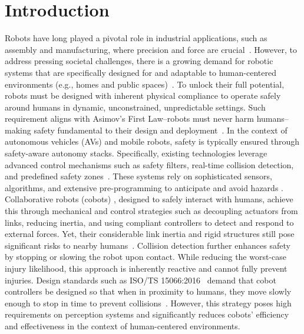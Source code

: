 \section{Introduction}
Robots have long played a pivotal role in industrial applications, such as assembly and manufacturing, where precision and force are crucial~\cite{todd1996fundamentals}.
However, to address pressing societal challenges, there is a growing demand for robotic systems that are specifically designed for and adaptable to human-centered environments (e.g., homes and public spaces)~\cite{nahavandi2019industry, chibani2013ubiquitous, royakkers2015literature}.
To unlock their full potential, robots must be designed with inherent physical compliance to operate safely around humans in dynamic, unconstrained, unpredictable settings.
Such requirement aligns with Asimov's First Law--robots must never harm humans--making safety fundamental to their design and deployment~\cite{villani2018survey}.
%
In the context of autonomous vehicles (AVs) and mobile robots, safety is typically ensured through safety-aware autonomy stacks. 
Specifically, existing technologies leverage advanced control mechanisms such as safety filters, real-time collision detection, and predefined safety zones~\cite{zhao2024potential}. 
These systems rely on sophisticated sensors, algorithms, and extensive pre-programming to anticipate and avoid hazards \cite{fragapane2021planning}. 
Collaborative robots (cobots) \cite{el2019cobot}, designed to safely interact with humans, achieve this through mechanical and control strategies such as decoupling actuators from links, reducing inertia, and using compliant controllers to detect and respond to external forces. 
Yet, their considerable link inertia and rigid structures still pose significant risks to nearby humans~\cite{haddadin2013towards}.
Collision detection further enhances safety by stopping or slowing the robot upon contact. While reducing the worst-case injury likelihood, this approach is inherently reactive and cannot fully prevent injuries.
Design standards such as ISO/TS 15066:2016~\cite{Isots_15066_2016} demand that cobot controllers be designed so that when in proximity to humans, they move slowly enough to stop in time to prevent collisions~\cite{ajoudani2018progress, lucci2020combining}. 
However, this strategy poses high requirements on perception systems and significantly reduces cobots' efficiency and effectiveness in the context of human-centered environments.

